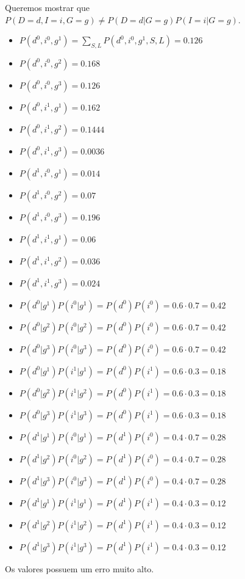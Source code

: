 Queremos mostrar que $P(D = d,I = i,G = g) \ne P(D = d|G = g)P(I = i|G = g)$.

\begin{itemize}
	\item $\displaystyle P({d^0},{i^0},{g^1}) = \sum\limits_{S,L} {P({d^0},{i^0},{g^1},S,L)}  = 0.126$
	\item $\displaystyle P({d^0},{i^0},{g^2}) = 0.168$
	\item $\displaystyle P({d^0},{i^0},{g^3}) = 0.126$
	\item $\displaystyle P({d^0},{i^1},{g^1}) = 0.162$
	\item $\displaystyle P({d^0},{i^1},{g^2}) = 0.1444$
	\item $\displaystyle P({d^0},{i^1},{g^3}) = 0.0036$
	\item $\displaystyle P({d^1},{i^0},{g^1}) = 0.014$
	\item $\displaystyle P({d^1},{i^0},{g^2}) = 0.07$
	\item $\displaystyle P({d^1},{i^0},{g^3}) = 0.196$
	\item $\displaystyle P({d^1},{i^1},{g^1}) = 0.06$
	\item $\displaystyle P({d^1},{i^1},{g^2}) = 0.036$
	\item $\displaystyle P({d^1},{i^1},{g^3}) = 0.024$
\end{itemize}

\begin{itemize}
	\item $\displaystyle P({d^0} | {g^1}) P({i^0} | {g^1}) = P({d^0}) P({i^0}) = 0.6 \cdot 0.7 = 0.42$
	\item $\displaystyle P({d^0} | {g^2}) P({i^0} | {g^2}) = P({d^0}) P({i^0}) = 0.6 \cdot 0.7 = 0.42$
	\item $\displaystyle P({d^0} | {g^3}) P({i^0} | {g^3}) = P({d^0}) P({i^0}) = 0.6 \cdot 0.7 = 0.42$
	\item $\displaystyle P({d^0} | {g^1}) P({i^1} | {g^1}) = P({d^0}) P({i^1}) = 0.6 \cdot 0.3 = 0.18$
	\item $\displaystyle P({d^0} | {g^2}) P({i^1} | {g^2}) = P({d^0}) P({i^1}) = 0.6 \cdot 0.3 = 0.18$
	\item $\displaystyle P({d^0} | {g^3}) P({i^1} | {g^3}) = P({d^0}) P({i^1}) = 0.6 \cdot 0.3 = 0.18$
	\item $\displaystyle P({d^1} | {g^1}) P({i^0} | {g^1}) = P({d^1}) P({i^0}) = 0.4 \cdot 0.7 = 0.28$
	\item $\displaystyle P({d^1} | {g^2}) P({i^0} | {g^2}) = P({d^1}) P({i^0}) = 0.4 \cdot 0.7 = 0.28$
	\item $\displaystyle P({d^1} | {g^3}) P({i^0} | {g^3}) = P({d^1}) P({i^0}) = 0.4 \cdot 0.7 = 0.28$
	\item $\displaystyle P({d^1} | {g^1}) P({i^1} | {g^1}) = P({d^1}) P({i^1}) = 0.4 \cdot 0.3 = 0.12$
	\item $\displaystyle P({d^1} | {g^2}) P({i^1} | {g^2}) = P({d^1}) P({i^1}) = 0.4 \cdot 0.3 = 0.12$
	\item $\displaystyle P({d^1} | {g^3}) P({i^1} | {g^3}) = P({d^1}) P({i^1}) = 0.4 \cdot 0.3 = 0.12$	
\end{itemize}

Os valores possuem um erro muito alto.